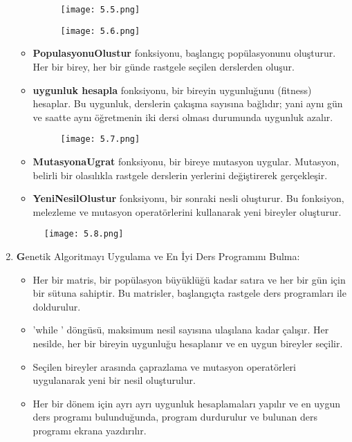 \documentclass[12pt, a4paper]{article}
\begin{document}
\begin{flushleft}
\begin{enumerate}
\begin{itemize}
		\begin{figure}[!h]
			\centering
			\texttt{[image: 5.5.png]}
			\\[20pt]
		\end{figure}
		\newpage
		
		
		\begin{figure}[!h]
			\centering
			\texttt{[image: 5.6.png]}
			\\[20pt]
		\end{figure}
		
		\item \textbf{PopulasyonuOlustur} fonksiyonu, başlangıç popülasyonunu oluşturur. Her bir birey, her bir günde rastgele seçilen derslerden oluşur.
		
		\item \textbf{uygunluk hesapla} fonksiyonu, bir bireyin uygunluğunu (fitness) hesaplar. Bu uygunluk, derslerin çakışma sayısına bağlıdır; yani aynı gün ve saatte aynı öğretmenin iki dersi olması durumunda uygunluk azalır.
		\newpage
		\begin{figure}[!h]
			\centering
			\texttt{[image: 5.7.png]}
			\\[20pt]
		\end{figure}
		\item \textbf{MutasyonaUgrat} fonksiyonu, bir bireye mutasyon uygular. Mutasyon, belirli bir olasılıkla rastgele derslerin yerlerini değiştirerek gerçekleşir.
		\item \textbf{YeniNesilOlustur} fonksiyonu, bir sonraki nesli oluşturur. Bu fonksiyon, melezleme ve mutasyon operatörlerini kullanarak yeni bireyler oluşturur.
		
		
	\end{itemize}
	\newpage
	\begin{figure}[!h]
		\centering
		\texttt{[image: 5.8.png]}
		
	\end{figure}
	
	
	\item \textbf Genetik Algoritmayı Uygulama ve En İyi Ders Programını Bulma:
	\begin{itemize}
		\item  Her bir matris, bir popülasyon büyüklüğü kadar satıra ve her bir gün için bir sütuna sahiptir. Bu matrisler, başlangıçta rastgele ders programları ile doldurulur.
		\item 'while ' döngüsü, maksimum nesil sayısına ulaşılana kadar çalışır. Her nesilde, her bir bireyin uygunluğu hesaplanır ve en uygun bireyler seçilir.
		\item Seçilen bireyler arasında çaprazlama ve mutasyon operatörleri uygulanarak yeni bir nesil oluşturulur.
		\item Her bir dönem için ayrı ayrı uygunluk hesaplamaları yapılır ve en uygun ders programı bulunduğunda, program durdurulur ve bulunan ders programı ekrana yazdırılır.
		

\end{itemize}
\end{enumerate}
\end{flushleft}
\end{document}
